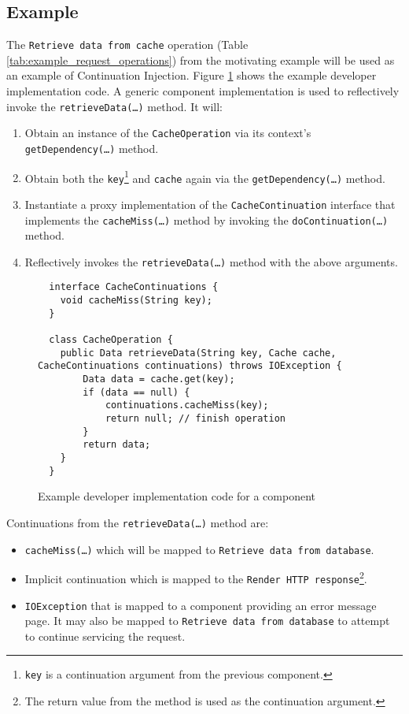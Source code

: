\documentclass[prodmode]{style/acmlarge}
\begin{document}
\subsection{Example}

The \texttt{Retrieve data from cache} operation (Table
\ref{tab:example_request_operations}) from the motivating example will be used
as an example of Continuation Injection.  Figure
\ref{fig:Example_Method_Operation} shows the example developer implementation
code.  A generic component implementation is used to reflectively invoke the
\texttt{retrieveData(\ldots)} method. It will:
\begin{enumerate}
  \item Obtain an instance of the \texttt{CacheOperation} via its context's \texttt{getDependency(\ldots)} method.
  \item Obtain both the \texttt{key}\footnote{\texttt{key} is a continuation argument from the previous component.} and \texttt{cache} again via the \texttt{getDependency(\ldots)} method.
  \item Instantiate a proxy implementation of the \texttt{CacheContinuation} interface that implements the \texttt{cacheMiss(\ldots)} method by invoking the \texttt{doContinuation(\ldots)} method. 
  \item Reflectively invokes the \texttt{retrieveData(\ldots)} method with the above arguments.
\end{enumerate}

\begin{figure}[tp]
\centering
\begin{verbatim}
  interface CacheContinuations {
    void cacheMiss(String key);
  }

  class CacheOperation {    
    public Data retrieveData(String key, Cache cache, CacheContinuations continuations) throws IOException {
        Data data = cache.get(key);
        if (data == null) {
            continuations.cacheMiss(key);
            return null; // finish operation
        }
        return data;
    }
  }
\end{verbatim}
\caption{Example developer implementation code for a component\footnotemark}
\label{fig:Example_Method_Operation}
\end{figure}

Continuations from the \texttt{retrieveData(\ldots)} method are:
\begin{itemize}
  \item \texttt{cacheMiss(\ldots)} which will be mapped to \texttt{Retrieve data from database}.
  \item Implicit continuation which is mapped to the \texttt{Render HTTP response}\footnote{The return value from the method is used as the continuation argument.}.
  \item \texttt{IOException} that is mapped to a component providing an error message page.  It may also be mapped to \texttt{Retrieve data from database} to attempt to continue servicing the request.
\end{itemize}
\end{document}
